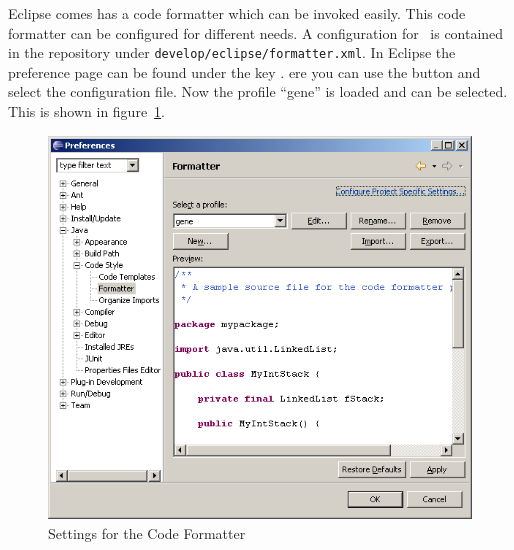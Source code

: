 Eclipse comes has a code formatter which can be invoked easily. This
code formatter can be configured for different needs. A configuration
for \ExTeX\ is contained in the repository under
\texttt{develop/eclipse/formatter.xml}. In Eclipse the preference page
can be found under the key .
ere you can use the button  and select the
configuration file. Now the profile ``gene'' is loaded and can be
selected. This is shown in figure~\ref{fig:eclipse-formatter-gene}.
\begin{figure}[htp]
  \centering  \includegraphics[scale=.4]{image/eclipse-formatter-gene}
  \caption{Settings for the Code Formatter}\label{fig:eclipse-formatter-gene}
\end{figure}


